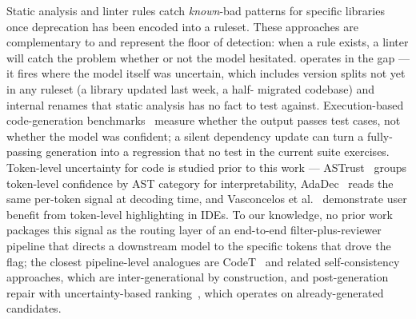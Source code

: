 Static analysis and linter rules catch \emph{known}-bad patterns for
specific libraries once deprecation has been encoded into a ruleset.
These approaches are complementary to \eps and represent the floor
of detection: when a rule exists, a linter will catch the problem
whether or not the model hesitated. \eps operates in the gap --- it
fires where the model itself was uncertain, which includes version
splits not yet in any ruleset (a library updated last week, a half-%
migrated codebase) and internal renames that static analysis has no
fact to test against. Execution-based code-generation
benchmarks~\cite{chen2021evaluating,austin2021program,%
jimenez2024swebench} measure whether the output passes test cases,
not whether the model was confident; a silent dependency update can
turn a fully-passing generation into a regression that no test in
the current suite exercises. Token-level uncertainty for code is studied prior to this work ---
ASTrust~\cite{palacio2024astrust} groups token-level confidence by
AST category for interpretability, AdaDec~\cite{adadec2025} reads
the same per-token signal at decoding time, and Vasconcelos et
al.~\cite{vasconcelos2024genprob} demonstrate user benefit from
token-level highlighting in IDEs. To our knowledge, no prior work
packages this signal as the routing layer of an end-to-end
filter-plus-reviewer pipeline that directs a downstream model to
the specific tokens that drove the flag; the closest pipeline-level
analogues are CodeT~\cite{chen2022codet} and related
self-consistency approaches, which are inter-generational by
construction, and post-generation repair with uncertainty-based
ranking~\cite{ye2022selfapr}, which operates on already-generated
candidates.

